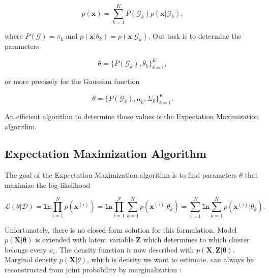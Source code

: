 \begin{equation}
	p(\mathbf{x}) = \sum_{k=1}^{K} P(\mathcal{G}_k) p(\mathbf{x} | \mathcal{G}_k),
\end{equation}

where $P(\mathcal{G}) = \pi_k$ and $ p(\mathbf{x} | \theta_k) =  p(\mathbf{x} | \mathcal{G}_k)$. Out task is to determine the parameters

\begin{equation}
	 \theta = \{ P(\mathcal{G}_k), \theta_k \}_{k=1}^K,
\end{equation}


or more precisely for the Gaussian function

\begin{equation}
	 \theta = \{ P(\mathcal{G}_k), \mu_k, \Sigma_k \}_{k=1}^K.
\end{equation}


An efficient algorithm to determine those values is the Expectation Maximization algorithm.




\subsection{Expectation Maximization Algorithm}

The goal of the Expectation Maximization algorithm is to find parameters $\theta$ that maximize the log-likelihood 

\begin{equation}
	\mathcal{L}(\theta | \mathcal{D}) = \mathtt{ln}\prod_{i=1}^{N}p(\mathbf{x}^{(i)}) = \mathtt{ln}\prod_{i=1}^{N}\sum_{k=1}^{K}p(\mathbf{x}^{(i)} | \theta_k) = \sum_{i=1}^{N}\mathtt{ln}\sum_{k=1}^{K}p(\mathbf{x}^{(i)} | \theta_k).
\end{equation}

Unfortunately, there is no closed-form solution for this formulation. Model $p( \mathbf{X} | \boldsymbol \theta)$ is extended with latent variable $\mathbf{Z}$ which determines to which cluster belongs every $x_i$. The density function is now described with $p(\mathbf{X}, \mathbf{Z} | \boldsymbol \theta)$. Marginal density $p(\mathbf{X} | \theta)$, which is density we want to estimate, can always be reconstructed from joint probability by marginalization :

